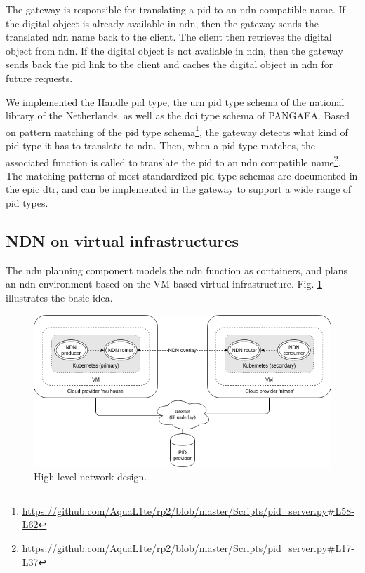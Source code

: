 \documentclass[conference]{IEEEtran}
\begin{document}
The gateway is responsible for translating a \gls{pid} to an \gls{ndn} compatible name. If the digital object is already available in \gls{ndn}, then the gateway sends the translated \gls{ndn} name back to the client. The client then retrieves the digital object from \gls{ndn}. If the digital object is not available in \gls{ndn}, then the gateway sends back the \gls{pid} link to the client and caches the digital object in \gls{ndn} for future requests.

We implemented the Handle \gls{pid} type, the \gls{urn} \gls{pid} type schema of the national library of the Netherlands, as well as the \gls{doi} type schema of PANGAEA. Based on pattern matching of the \gls{pid} type schema\footnote{\url{https://github.com/AquaL1te/rp2/blob/master/Scripts/pid_server.py#L58-L62}}, the gateway detects what kind of \gls{pid} type it has to translate to \gls{ndn}. Then, when a \gls{pid} type matches, the associated function is called to translate the \gls{pid} to an \gls{ndn} compatible name\footnote{\url{https://github.com/AquaL1te/rp2/blob/master/Scripts/pid_server.py#L17-L37}}. The matching patterns of most standardized \gls{pid} type schemas are documented in the \gls{epic} \gls{dtr}, and can be implemented in the gateway \cite{dtr} to support a wide range of \gls{pid} types. 

\subsection{NDN on virtual infrastructures}
The \gls{ndn} planning component models the \gls{ndn} function as containers, and plans an \gls{ndn} environment based on the VM based virtual infrastructure. Fig. \ref{fig:high-level-network-design} illustrates the basic idea.

\begin{figure}[H]
\centering
\includegraphics[width=\columnwidth]{images/high-level-network-design.png}
\caption{High-level network design.}
\label{fig:high-level-network-design}
\end{figure}
\end{document}
